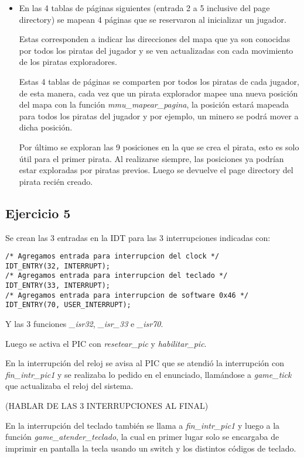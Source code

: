 \begin{itemize}
\item En las 4 tablas de páginas siguientes (entrada 2 a 5 inclusive del page
directory) se mapean 4 páginas que se reservaron al inicializar un jugador.

Estas corresponden a indicar las direcciones del mapa que ya son conocidas por
todos los piratas del jugador y se ven actualizadas con cada movimiento de los
piratas exploradores.

Estas 4 tablas de páginas se comparten por todos los piratas de cada jugador, de
esta manera, cada vez que un pirata explorador mapee una nueva posición del mapa
con la función {\it mmu_mapear_pagina\/}, la posición estará mapeada para todos
los piratas del jugador y por ejemplo, un minero se podrá mover a dicha posición.

Por último se exploran las 9 posiciones en la que se crea el pirata, esto es
solo útil para el primer pirata. Al realizarse siempre, las posiciones ya
podrían estar exploradas por piratas previos. Luego se devuelve el page
directory del pirata recién creado.
\end{itemize}

\subsection{Ejercicio 5}

Se crean las 3 entradas en la IDT para las 3 interrupciones indicadas con:
\begin{lstlisting}
/* Agregamos entrada para interrupcion del clock */
IDT_ENTRY(32, INTERRUPT);
/* Agregamos entrada para interrupcion del teclado */
IDT_ENTRY(33, INTERRUPT);
/* Agregamos entrada para interrupcion de software 0x46 */
IDT_ENTRY(70, USER_INTERRUPT);
\end{lstlisting}

Y las 3 funciones {\it _isr32\/}, {\it _isr_33\/} e {\it _isr70\/}.

Luego se activa el PIC con {\it resetear_pic\/} y {\it habilitar_pic\/}.

En la interrupción del reloj se avisa al PIC que se atendió la interrupción con
{\it fin_intr_pic1} y se realizaba lo pedido en el enunciado, llamándose a
{\it game_tick\/} que actualizaba el reloj del sistema.

(HABLAR DE LAS 3 INTERRUPCIONES AL FINAL)

En la interrupción del teclado también se llama a {\it fin_intr_pic1\/} y luego
a la función \hbox{\it game_atender_teclado\/}, la cual en primer lugar solo se
encargaba de imprimir en pantalla la tecla usando un switch y los distintos
códigos de teclado.

